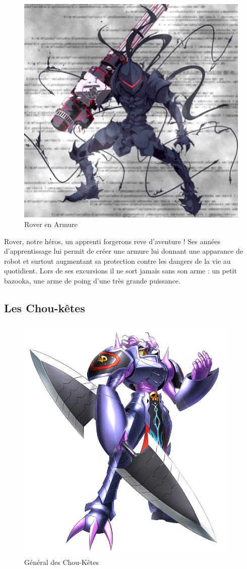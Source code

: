 \documentclass[a4paper 12pts]{article}
\begin{document}
\begin{figure}[h]
  	\includegraphics[width=350pt]{Illustration/Rover.jpg}
	\caption{Rover en Armure}
\end{figure}


Rover, notre héros, un apprenti forgerons reve d'aventure ! Ses années d'apprentissage lui permit de créer une armure lui donnant une apparance de robot et surtout augmentant sa protection contre les dangers de la vie au quotidient.
Lors de ses excursions il ne sort jamais sans son arme :  un petit bazooka, une arme de poing d'une très grande puissance.


\subsection{Les Chou-kêtes}
\vspace{1cm}


\begin{figure}[h]
  	\includegraphics[width=300pt]{Illustration/Badboy.jpg}
	\caption{Général des Chou-Kêtes}
\end{figure}
\end{document}
